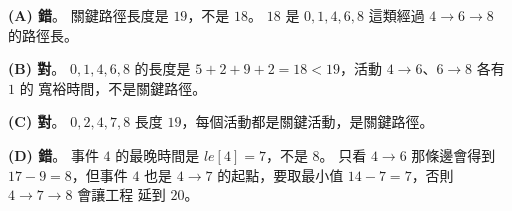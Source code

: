 \begin{pastsoln}
\textbf{(A) 錯}。 關鍵路徑長度是 $19$，不是 $18$。 $18$ 是 $0, 1, 4, 6, 8$ 這類經過 $4 \to 6 \to 8$ 的路徑長。

\textbf{(B) 對}。 $0, 1, 4, 6, 8$ 的長度是 $5 + 2 + 9 + 2 = 18 < 19$，活動 $4 \to 6$、$6 \to 8$ 各有 $1$ 的
寬裕時間，不是關鍵路徑。

\textbf{(C) 對}。 $0, 2, 4, 7, 8$ 長度 $19$，每個活動都是關鍵活動，是關鍵路徑。

\textbf{(D) 錯}。 事件 $4$ 的最晚時間是 $\mathit{le}[4] = 7$，不是 $8$。 只看 $4 \to 6$ 那條邊會得到
$17 - 9 = 8$，但事件 $4$ 也是 $4 \to 7$ 的起點，要取最小值 $14 - 7 = 7$，否則 $4 \to 7 \to 8$ 會讓工程
延到 $20$。
\end{pastsoln}

